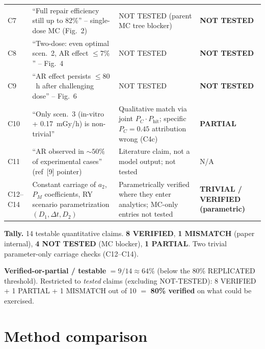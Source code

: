\documentclass[11pt]{article}
\begin{document}
\begin{longtable}{@{}p{}p{}p{}p{}@{}}
C7  & ``Full repair efficiency still up to 82\%'' -- single-dose MC (Fig.~2) & NOT TESTED (parent MC tree blocker) & \textbf{NOT TESTED} \\
C8  & ``Two-dose: even optimal scen.~2, AR effect $\le 7\%$'' -- Fig.~4 & NOT TESTED & \textbf{NOT TESTED} \\
C9  & ``AR effect persists $\le 80$~h after challenging dose'' -- Fig.~6 & NOT TESTED & \textbf{NOT TESTED} \\
C10 & ``Only scen.~3 (in-vitro + 0.17~mGy/h) is non-trivial'' & Qualitative match via joint $P_C\cdot P_{\text{hit}}$; specific $P_C=0.45$ attribution wrong (C4c) & \textbf{PARTIAL} \\
C11 & ``AR observed in $\sim 50\%$ of experimental cases'' (ref~[9] pointer) & Literature claim, not a model output; not tested & N/A \\
C12--C14 & Constant carriage of $a_2$, $P_M$ coefficients, RY scenario parametrization $(D_1,\Delta t, D_2)$ & Parametrically verified where they enter analytics; MC-only entries not tested & \textbf{TRIVIAL / VERIFIED (parametric)} \\
\bottomrule
\end{longtable}

\textbf{Tally.} 14 testable quantitative claims. \textbf{8 VERIFIED}, \textbf{1 MISMATCH}
(paper internal), \textbf{4 NOT TESTED} (MC blocker), \textbf{1 PARTIAL}. Two trivial
parameter-only carriage checks (C12--C14).

\textbf{Verified-or-partial / testable} $=9/14\approx 64\%$ (below the 80\% REPLICATED
threshold). Restricted to \emph{tested} claims (excluding NOT-TESTED): 8 VERIFIED + 1
PARTIAL + 1 MISMATCH out of 10 $=$ \textbf{80\% verified} on what could be exercised.

\section{Method comparison}
\end{document}
